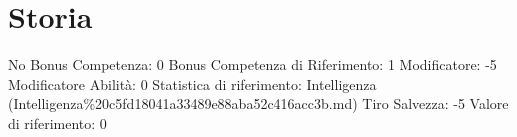 \section{Storia}\label{storia}

\begin{description}
\tightlist
\item[Tags: ABI]
No Bonus Competenza: 0 Bonus Competenza di Riferimento: 1 Modificatore:
-5 Modificatore Abilità: 0 Statistica di riferimento: Intelligenza
(Intelligenza\%20c5fd18041a33489e88aba52c416acc3b.md) Tiro Salvezza: -5
Valore di riferimento: 0
\end{description}
